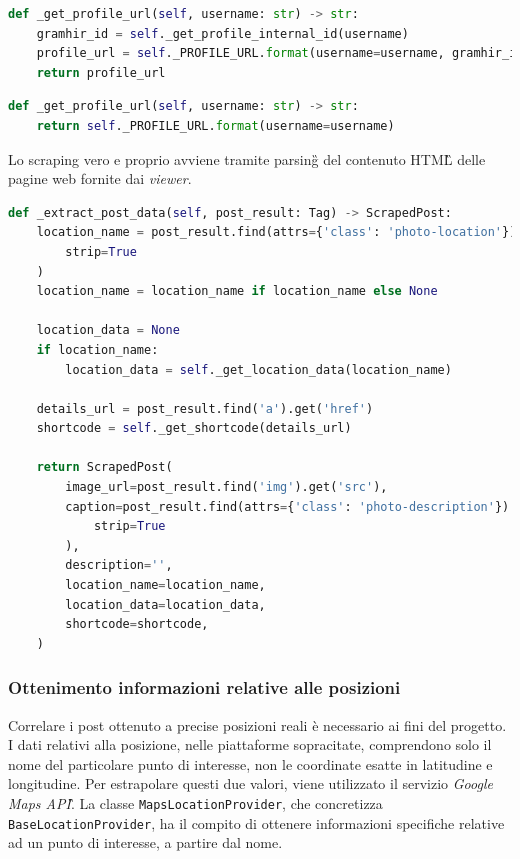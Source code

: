 \begin{lstlisting}[language=Python, caption=Ottenimento URL profilo in \textit{Gramhir}]
def _get_profile_url(self, username: str) -> str:
    gramhir_id = self._get_profile_internal_id(username)
    profile_url = self._PROFILE_URL.format(username=username, gramhir_id=gramhir_id)
    return profile_url
\end{lstlisting}

\begin{lstlisting}[language=Python, caption=Ottenimento URL profilo in \textit{Picuki}]
def _get_profile_url(self, username: str) -> str:
    return self._PROFILE_URL.format(username=username)
\end{lstlisting}

\aCapo{}
Lo scraping vero e proprio avviene tramite parsing\G{} del contenuto HTML\G{} delle pagine web
fornite dai \textit{viewer}.
\begin{lstlisting}[language=Python, caption=Estrazioni dati tramite parsing\G{}]
def _extract_post_data(self, post_result: Tag) -> ScrapedPost:
    location_name = post_result.find(attrs={'class': 'photo-location'}).get_text(
        strip=True
    )
    location_name = location_name if location_name else None

    location_data = None
    if location_name:
        location_data = self._get_location_data(location_name)

    details_url = post_result.find('a').get('href')
    shortcode = self._get_shortcode(details_url)

    return ScrapedPost(
        image_url=post_result.find('img').get('src'),
        caption=post_result.find(attrs={'class': 'photo-description'}).get_text(
            strip=True
        ),
        description='',
        location_name=location_name,
        location_data=location_data,
        shortcode=shortcode,
    )
\end{lstlisting}

\subsubsection{Ottenimento informazioni relative alle posizioni}
Correlare i post ottenuto a precise posizioni reali è necessario ai fini del progetto.
I dati relativi alla posizione, nelle piattaforme sopracitate, comprendono solo il nome del
particolare punto di interesse, non le coordinate esatte in latitudine e longitudine.
Per estrapolare questi due valori, viene utilizzato il servizio \textit{Google Maps API}\G.\aCapo{}
La classe \verb|MapsLocationProvider|, che concretizza \verb|BaseLocationProvider|, ha il compito
di ottenere informazioni specifiche relative ad un punto di interesse, a partire dal nome.

